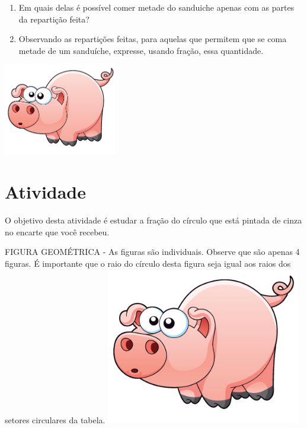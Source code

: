 \documentclass[a4,12pt]{book}
\newcounter{atividade}
\begin{document}
\begin{enumerate} [\quad a)] %
  \item     Em quais delas é possível comer metade do sanduiche apenas com as partes da repartição feita?
  \item     Observando as repartições feitas, para aquelas que permitem que se coma metade de um sanduíche, expresse, usando fração, essa quantidade.  
\end{enumerate} %










\includegraphics[width=\textwidth,height=4cm, keepaspectratio]{pig}
\section{Atividade}







O objetivo desta atividade é estudar a fração do círculo que está pintada de cinza no encarte que você recebeu.

\begin{imagem*}[breakable]{}{}   FIGURA GEOMÉTRICA - As figuras são individuais. Observe que são apenas 4 figuras.  
  É importante que o raio do círculo desta figura seja igual aos raios dos setores circulares da tabela.  
    \includegraphics[width=240pt, keepaspectratio]{pig}  
\end{imagem*}
\end{document}
